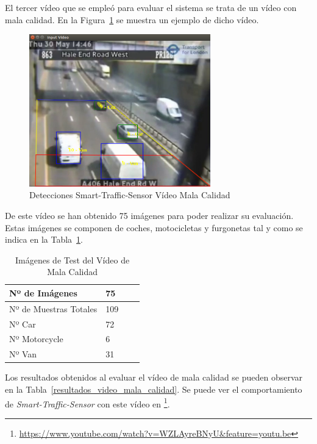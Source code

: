 El tercer vídeo que se empleó para evaluar el sistema se trata de un vídeo con mala calidad. En la Figura~\ref{fig.video_mala_calidad} se muestra un ejemplo de dicho vídeo.


\begin{figure}[H] 
\begin{center}
	\includegraphics[width=0.7\textwidth]{figures/Experimentos/sts_mala_calidad.png}
   \caption{Detecciones Smart-Traffic-Sensor Vídeo Mala Calidad}
	\label{fig.video_mala_calidad}
\end{center}
\end{figure}

De este vídeo se han obtenido 75 imágenes para poder realizar su evaluación. Estas imágenes se componen de coches, motocicletas y furgonetas tal y como se indica en la Tabla~\ref{tabla_video_mala_calidad}. 

\begin{table}[H] 
\begin{center}
\begin{tabular}{|l|l|l|l|}
\hline
Nº de Imágenes  & 75 \\
\hline \hline
Nº de Muestras Totales & 109\\ \hline
Nº Car & 72 \\ \hline
Nº Motorcycle & 6 \\ \hline
Nº Van & 31 \\ \hline
\end{tabular}
\caption{Imágenes de Test del Vídeo de Mala Calidad}
\label{tabla_video_mala_calidad}
\end{center}
\end{table}

Los resultados obtenidos al evaluar el vídeo de mala calidad se pueden observar en la Tabla~\ref{resultados_video_mala_calidad}. Se puede ver el comportamiento de \textit{Smart-Traffic-Sensor} con este vídeo en \footnote{\url{https://www.youtube.com/watch?v=WZLAyreBNyU&feature=youtu.be}}.

